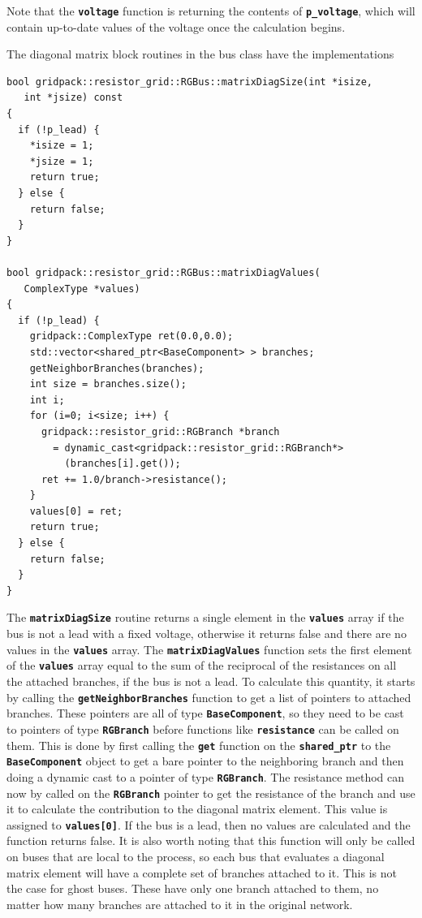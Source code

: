 Note that the \texttt{\textbf{voltage}} function is returning the contents of \texttt{\textbf{p\_voltage}}, which will contain up-to-date values of the voltage once the calculation begins.

The diagonal matrix block routines in the bus class have the implementations

{
\color{red}
\begin{Verbatim}[fontseries=b]
bool gridpack::resistor_grid::RGBus::matrixDiagSize(int *isize,
   int *jsize) const
{
  if (!p_lead) {
    *isize = 1;
    *jsize = 1;
    return true;
  } else {
    return false;
  }
}

bool gridpack::resistor_grid::RGBus::matrixDiagValues(
   ComplexType *values)
{
  if (!p_lead) {
    gridpack::ComplexType ret(0.0,0.0);
    std::vector<shared_ptr<BaseComponent> > branches;
    getNeighborBranches(branches);
    int size = branches.size();
    int i;
    for (i=0; i<size; i++) {
      gridpack::resistor_grid::RGBranch *branch
        = dynamic_cast<gridpack::resistor_grid::RGBranch*>
          (branches[i].get());
      ret += 1.0/branch->resistance();
    }
    values[0] = ret;
    return true;
  } else {
    return false;
  }
}
\end{Verbatim}
}

The \texttt{\textbf{matrixDiagSize}} routine returns a single element in the \texttt{\textbf{values}} array if the bus is not a lead with a fixed voltage, otherwise it returns false and there are no values in the \texttt{\textbf{values}} array. The \texttt{\textbf{matrixDiagValues}} function sets the first element of the \texttt{\textbf{values}} array equal to the sum of the reciprocal of the resistances on all the attached branches, if the bus is not a lead. To calculate this quantity, it starts by calling the \texttt{\textbf{getNeighborBranches}} function to get a list of pointers to attached branches. These pointers are all of type \texttt{\textbf{BaseComponent}}, so they need to be cast to pointers of type \texttt{\textbf{RGBranch}} before functions like \texttt{\textbf{resistance}} can be called on them. This is done by first calling the \texttt{\textbf{get}} function on the \texttt{\textbf{shared\_ptr}} to the \texttt{\textbf{BaseComponent}} object to get a bare pointer to the neighboring branch and then doing a dynamic cast to a pointer of type \texttt{\textbf{RGBranch}}. The resistance method can now by called on the \texttt{\textbf{RGBranch}} pointer to get the resistance of the branch and use it to calculate the contribution to the diagonal matrix element. This value is assigned to \texttt{\textbf{values[0]}}. If the bus is a lead, then no values are calculated and the function returns false. It is also worth noting that this function will only be called on buses that are local to the process, so each bus that evaluates a diagonal matrix element will have a complete set of branches attached to it. This is not the case for ghost buses. These have only one branch attached to them, no matter how many branches are attached to it in the original network.

